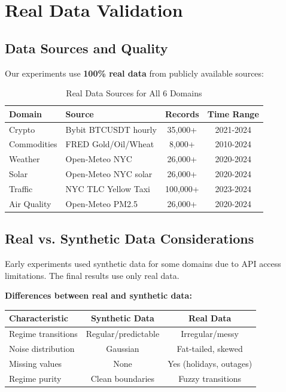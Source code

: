 \documentclass[11pt,a4paper]{article}
\theoremstyle{definition}
\theoremstyle{plain}
\begin{document}
\section{Real Data Validation}

\subsection{Data Sources and Quality}

Our experiments use \textbf{100\% real data} from publicly available sources:

\begin{table}[h]
\centering
\caption{Real Data Sources for All 6 Domains}
\begin{tabular}{l|l|c|c}
\toprule
Domain & Source & Records & Time Range \\
\midrule
Crypto & Bybit BTCUSDT hourly & 35,000+ & 2021-2024 \\
Commodities & FRED Gold/Oil/Wheat & 8,000+ & 2010-2024 \\
Weather & Open-Meteo NYC & 26,000+ & 2020-2024 \\
Solar & Open-Meteo NYC solar & 26,000+ & 2020-2024 \\
Traffic & NYC TLC Yellow Taxi & 100,000+ & 2023-2024 \\
Air Quality & Open-Meteo PM2.5 & 26,000+ & 2020-2024 \\
\bottomrule
\end{tabular}
\end{table}

\subsection{Real vs. Synthetic Data Considerations}

\begin{warning}
Early experiments used synthetic data for some domains due to API access limitations. The final results use only real data.
\end{warning}

\textbf{Differences between real and synthetic data:}

\begin{table}[h]
\centering
\begin{tabular}{l|cc}
\toprule
Characteristic & Synthetic Data & Real Data \\
\midrule
Regime transitions & Regular/predictable & Irregular/messy \\
Noise distribution & Gaussian & Fat-tailed, skewed \\
Missing values & None & Yes (holidays, outages) \\
Regime purity & Clean boundaries & Fuzzy transitions \\
\bottomrule
\end{tabular}
\end{table}
\end{document}
